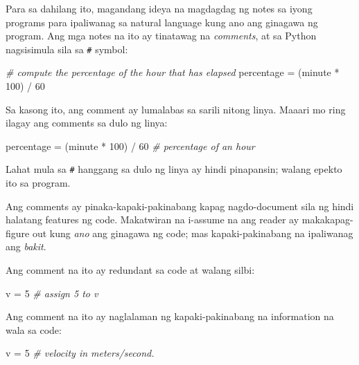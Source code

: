 \documentclass[10pt,]{book}
\newenvironment{Shaded}{}{}
\newcommand{\CommentTok}[1]{\textcolor[rgb]{0.38,0.63,0.69}{\textit{#1}}}
\newcommand{\DecValTok}[1]{\textcolor[rgb]{0.25,0.63,0.44}{#1}}
\newcommand{\NormalTok}[1]{#1}
\newcommand{\OperatorTok}[1]{\textcolor[rgb]{0.40,0.40,0.40}{#1}}
\begin{document}
Para sa dahilang ito, magandang ideya na magdagdag ng notes sa iyong
programs para ipaliwanag sa natural language kung ano ang ginagawa ng
program. Ang mga notes na ito ay tinatawag na \emph{comments}, at sa
Python nagsisimula sila sa \texttt{\#} symbol:

\begin{Shaded}
\begin{Highlighting}[]
\CommentTok{\# compute the percentage of the hour that has elapsed}
\NormalTok{percentage }\OperatorTok{=}\NormalTok{ (minute }\OperatorTok{*} \DecValTok{100}\NormalTok{) }\OperatorTok{/} \DecValTok{60}
\end{Highlighting}
\end{Shaded}

Sa kasong ito, ang comment ay lumalabas sa sarili nitong linya. Maaari
mo ring ilagay ang comments sa dulo ng linya:

\begin{Shaded}
\begin{Highlighting}[]
\NormalTok{percentage }\OperatorTok{=}\NormalTok{ (minute }\OperatorTok{*} \DecValTok{100}\NormalTok{) }\OperatorTok{/} \DecValTok{60}     \CommentTok{\# percentage of an hour}
\end{Highlighting}
\end{Shaded}

Lahat mula sa \texttt{\#} hanggang sa dulo ng linya ay hindi pinapansin;
walang epekto ito sa program.

Ang comments ay pinaka-kapaki-pakinabang kapag nagdo-document sila ng
hindi halatang features ng code. Makatwiran na i-assume na ang reader ay
makakapag-figure out kung \emph{ano} ang ginagawa ng code; mas
kapaki-pakinabang na ipaliwanag ang \emph{bakit}.

Ang comment na ito ay redundant sa code at walang silbi:

\begin{Shaded}
\begin{Highlighting}[]
\NormalTok{v }\OperatorTok{=} \DecValTok{5}     \CommentTok{\# assign 5 to v}
\end{Highlighting}
\end{Shaded}

Ang comment na ito ay naglalaman ng kapaki-pakinabang na information na
wala sa code:

\begin{Shaded}
\begin{Highlighting}[]
\NormalTok{v }\OperatorTok{=} \DecValTok{5}     \CommentTok{\# velocity in meters/second.}
\end{Highlighting}
\end{Shaded}
\end{document}
